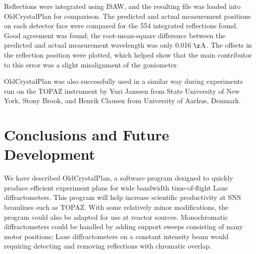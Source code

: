 \documentclass[final]{iucr}              %
\newcommand{\ang}{$\mathrm{\AA} $}
\begin{document}
Reflections were integrated using ISAW, and the resulting file was
loaded into OldCrystalPlan for comparison. The predicted and actual measurement
positions on each detector face were compared for the 554 integrated reflections
found. Good agreement was found; the root-mean-square difference between the
predicted and actual measurement wavelength was only 0.016 \ang. The offsets in the reflection
position were plotted, which helped show that the main contributor to this error
was a slight misalignment of the goniometer.


OldCrystalPlan was also successfully used in a similar way during experiments run
on the TOPAZ instrument by Yuri Janssen from State University of New York, Stony
Brook, and Henrik Clausen from University of Aarhus, Denmark. 


\section{Conclusions and Future Development}

We have described OldCrystalPlan, a software program designed to quickly produce
efficient experiment plans for wide bandwidth time-of-flight Laue
diffractometers. This program will help increase scientific productivity at SNS
beamlines such as TOPAZ. With some relatively minor modifications, the program
could also be adapted for use at reactor sources. Monochromatic diffractometers
could be handled by adding support sweeps consisting of many motor positions;
Laue diffractometers on a constant intensity beam would requiring
detecting and removing reflections with chromatic overlap.
\end{document}
